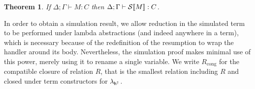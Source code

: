 \documentclass[12pt,phd,lfcs,twoside,openright,logo,leftchapter,normalheadings]{infthesis}
\theoremstyle{plain}
\newtheorem{theorem}{Theorem}[chapter]
\theoremstyle{definition}
\begin{document}

\begin{theorem}
If $\Delta; \Gamma \vdash M : C$ then $\Delta; \Gamma \vdash
\mathcal{S}\llbracket M \rrbracket : C$.
\end{theorem}

In order to obtain a simulation result, we allow reduction in the
simulated term to be performed under lambda abstractions (and indeed
anywhere in a term), which is necessary because of the redefinition of
the resumption to wrap the handler around its body.
%
Nevertheless, the simulation proof makes minimal use of this power,
merely using it to rename a single variable.
%
We write $R_{\mathrm{cong}}$ for the compatible closure of relation
$R$, that is the smallest relation including $R$ and closed under term
constructors for $\lambda_{\mathsf{h^\dagger}}$.
\end{document}
